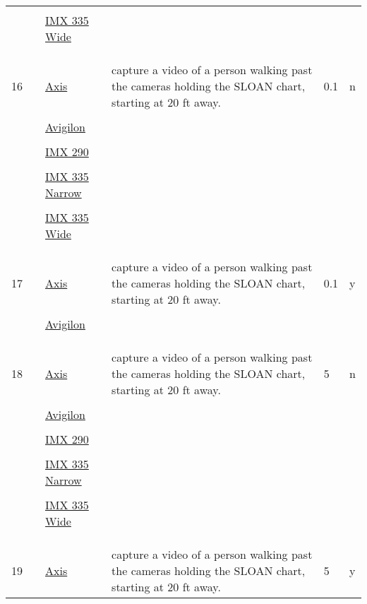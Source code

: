 \documentclass{article}%
\begin{document}
\begin{longtabu}{m{2.5cm} m{4cm} m{2cm} m{4cm} m{2cm} m{2cm}}
&&&&&\\%
&&\href{https://google.com}{IMX 335 Wide}&&&\\%
&&&&&\\%
&&&&&\\%
\hline%
&&&&&\\%
16&&\href{https://google.com}{Axis}&capture a video of a person walking past the cameras holding the SLOAN chart, starting at 20 ft away.&0.1&n\\%
&&&&&\\%
&&\href{https://google.com}{Avigilon}&&&\\%
&&&&&\\%
&&\href{https://google.com}{IMX 290}&&&\\%
&&&&&\\%
&&\href{https://google.com}{IMX 335 Narrow}&&&\\%
&&&&&\\%
&&\href{https://google.com}{IMX 335 Wide}&&&\\%
&&&&&\\%
&&&&&\\%
\hline%
&&&&&\\%
17&&\href{https://google.com}{Axis}&capture a video of a person walking past the cameras holding the SLOAN chart, starting at 20 ft away.&0.1&y\\%
&&&&&\\%
&&\href{https://google.com}{Avigilon}&&&\\%
&&&&&\\%
&&&&&\\%
\hline%
&&&&&\\%
18&&\href{https://google.com}{Axis}&capture a video of a person walking past the cameras holding the SLOAN chart, starting at 20 ft away.&5&n\\%
&&&&&\\%
&&\href{https://google.com}{Avigilon}&&&\\%
&&&&&\\%
&&\href{https://google.com}{IMX 290}&&&\\%
&&&&&\\%
&&\href{https://google.com}{IMX 335 Narrow}&&&\\%
&&&&&\\%
&&\href{https://google.com}{IMX 335 Wide}&&&\\%
&&&&&\\%
&&&&&\\%
\hline%
&&&&&\\%
19&&\href{https://google.com}{Axis}&capture a video of a person walking past the cameras holding the SLOAN chart, starting at 20 ft away.&5&y\\%

\end{longtabu}
\end{document}
